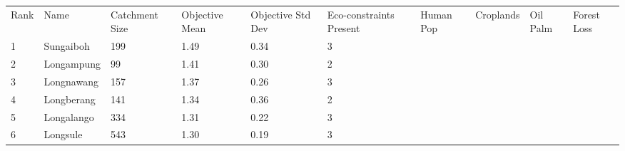 \begin{table}[ht]
\centering
\begingroup\fontsize{8pt}{9pt}\selectfont
\begin{tabular}{C{0.03\textwidth}C{0.12\textwidth}C{0.09\textwidth}C{0.08\textwidth}C{0.08\textwidth}C{0.08\textwidth}C{0.07\textwidth}C{0.07\textwidth}C{0.07\textwidth}C{0.07\textwidth}}
 Rank & Name & Catchment Size & Objective Mean & Objective Std Dev & Eco-constraints  Present & Human Pop & Croplands & Oil Palm & Forest Loss \\ 
 {1} & Sungaiboh & 199 & \textcolor[HTML]{FFFFFF}{1.49} & \textcolor[HTML]{FFFFFF}{0.34} & \textcolor[HTML]{FFFFFF}{3} &  &  &  &  \\ 
  {2} & Longampung &  99 & \textcolor[HTML]{FFFFFF}{1.41} & \textcolor[HTML]{000000}{0.30} & \textcolor[HTML]{000000}{2} &  &  &  &  \\ 
  {3} & Longnawang & 157 & \textcolor[HTML]{FFFFFF}{1.37} & \textcolor[HTML]{000000}{0.26} & \textcolor[HTML]{FFFFFF}{3} &  &  &  &  \\ 
  {4} & Longberang & 141 & \textcolor[HTML]{FFFFFF}{1.34} & \textcolor[HTML]{FFFFFF}{0.36} & \textcolor[HTML]{000000}{2} &  &  &  &  \\ 
  {5} & Longalango & 334 & \textcolor[HTML]{FFFFFF}{1.31} & \textcolor[HTML]{000000}{0.22} & \textcolor[HTML]{FFFFFF}{3} &  &  &  &  \\ 
  {6} & Longsule & 543 & \textcolor[HTML]{FFFFFF}{1.30} & \textcolor[HTML]{000000}{0.19} & \textcolor[HTML]{FFFFFF}{3} &  &  &  &  \\ 

\end{tabular}
\end{table}
